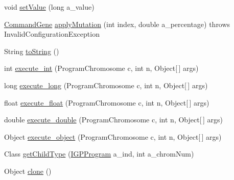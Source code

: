 \begin{DoxyCompactItemize}
\item 
void \hyperlink{classorg_1_1jgap_1_1gp_1_1terminal_1_1_terminal_a3281b004bd5807e2b55626c2e8cb4cec}{set\-Value} (long a\-\_\-value)
\item 
\hyperlink{classorg_1_1jgap_1_1gp_1_1_command_gene}{Command\-Gene} \hyperlink{classorg_1_1jgap_1_1gp_1_1terminal_1_1_terminal_aa83c3694e0ae92eee2d50696d693ba23}{apply\-Mutation} (int index, double a\-\_\-percentage)  throws Invalid\-Configuration\-Exception 
\item 
String \hyperlink{classorg_1_1jgap_1_1gp_1_1terminal_1_1_terminal_aba0e317a3a2fb6b2c5916e916763f795}{to\-String} ()
\item 
int \hyperlink{classorg_1_1jgap_1_1gp_1_1terminal_1_1_terminal_a922ab6e055e15585084b42e191815255}{execute\-\_\-int} (Program\-Chromosome c, int n, Object\mbox{[}$\,$\mbox{]} args)
\item 
long \hyperlink{classorg_1_1jgap_1_1gp_1_1terminal_1_1_terminal_a18b7acf8181cf3a3c6fc3238ccc4d86f}{execute\-\_\-long} (Program\-Chromosome c, int n, Object\mbox{[}$\,$\mbox{]} args)
\item 
float \hyperlink{classorg_1_1jgap_1_1gp_1_1terminal_1_1_terminal_a4068d36d2790e32e65a7636138497e16}{execute\-\_\-float} (Program\-Chromosome c, int n, Object\mbox{[}$\,$\mbox{]} args)
\item 
double \hyperlink{classorg_1_1jgap_1_1gp_1_1terminal_1_1_terminal_a40d5ec54b8a88dda453fd4ea407519ca}{execute\-\_\-double} (Program\-Chromosome c, int n, Object\mbox{[}$\,$\mbox{]} args)
\item 
Object \hyperlink{classorg_1_1jgap_1_1gp_1_1terminal_1_1_terminal_ae4ed0da8a98fa579864561aeb0f97bd3}{execute\-\_\-object} (Program\-Chromosome c, int n, Object\mbox{[}$\,$\mbox{]} args)
\item 
Class \hyperlink{classorg_1_1jgap_1_1gp_1_1terminal_1_1_terminal_a67ff57c463a12dd0a798e7aec5ed963c}{get\-Child\-Type} (\hyperlink{interfaceorg_1_1jgap_1_1gp_1_1_i_g_p_program}{I\-G\-P\-Program} a\-\_\-ind, int a\-\_\-chrom\-Num)
\item 
Object \hyperlink{classorg_1_1jgap_1_1gp_1_1terminal_1_1_terminal_a75cd6e6e72b9eb56455aa37400876d0c}{clone} ()
\end{DoxyCompactItemize}
